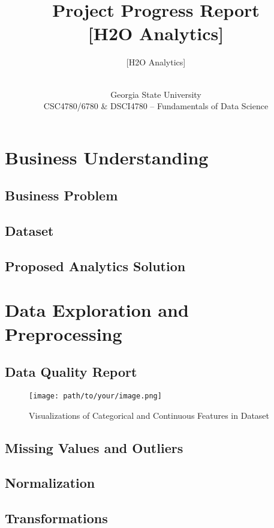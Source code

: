 \documentclass[12pt]{article}
\title{\vspace{-1.5cm}Project Progress Report \\ \large [H2O Analytics]}
\author{
[H2O Analytics]\\
[Julian Ornelase]\\
[Emery Hagye]
}
\date{Georgia State University\\ CSC4780/6780 \& DSCI4780 – Fundamentals of Data Science \\ [Spring 2024]}
\begin{document}
\maketitle
\newpage

\tableofcontents
\newpage

\section{Business Understanding}
\subsection{Business Problem}
\lipsum[1-2]

\subsection{Dataset}
\lipsum[3]

\subsection{Proposed Analytics Solution}
\lipsum[4-5]

\section{Data Exploration and Preprocessing}
\subsection{Data Quality Report}
\lipsum[6]

\begin{figure}[H]
\centering
\texttt{[image: path/to/your/image.png]}
\caption{Visualizations of Categorical and Continuous Features in Dataset}
\end{figure}

\subsection{Missing Values and Outliers}
\lipsum[7]

\subsection{Normalization}
\lipsum[8]

\subsection{Transformations}
\lipsum[9]
\end{document}
